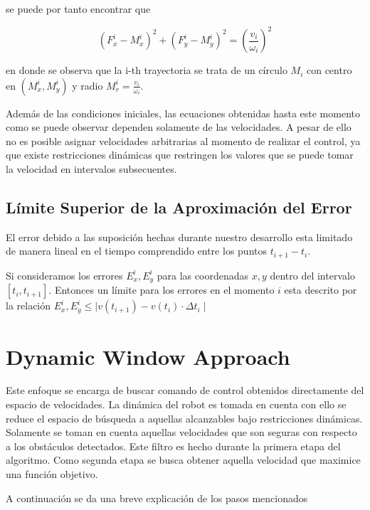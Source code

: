 \documentclass[12pt]{article}
\begin{document}
se puede por tanto encontrar que

\begin{equation}
	(F_x^i - M_x^i)^2 + (F_y^i - M_y^i)^2 = \left(\frac{v_i}{\omega_i}\right)^2
\end{equation}

en donde se observa que la i-th trayectoria se trata de un círculo $M_i$ con centro en $(M_x^i, M_y^i)$ y radio $M_r^i = \frac{v_i}{\omega_i}$.

Además de las condiciones iniciales, las ecuaciones obtenidas hasta este momento como se puede observar dependen solamente de las velocidades. A pesar de ello no es posible asignar velocidades arbitrarias al momento de realizar el control, ya que existe restricciones dinámicas que restringen los valores que se puede tomar la velocidad en intervalos subsecuentes.

\subsection{Límite Superior de la Aproximación del Error}

El error debido a las suposición hechas durante nuestro desarrollo esta limitado de manera lineal en el tiempo comprendido entre los puntos $t_{i+1} - t_i$.

Si consideramos los errores $E_x^i, E_y^i$ para las coordenadas $x, y$ dentro del intervalo $[t_i, t_{i+1}]$. Entonces un límite para los errores en el momento $i$ esta descrito por la relación $E_x^i, E_y^i\leq \mid v(t_{i+1}) - v(t_i) \cdot \Delta t_i \mid$

\section{Dynamic Window Approach}

Este enfoque se encarga de buscar comando de control obtenidos directamente del espacio de velocidades. La dinámica del robot es tomada en cuenta con ello se reduce el espacio de búsqueda a aquellas alcanzables bajo restricciones dinámicas. Solamente se toman en cuenta aquellas velocidades que son seguras con respecto a los obstáculos detectados. Este filtro es hecho durante la primera etapa del algoritmo. Como segunda etapa se busca obtener aquella velocidad que maximice una función objetivo.

A continuación se da una breve explicación de los pasos mencionados

\end{document}
